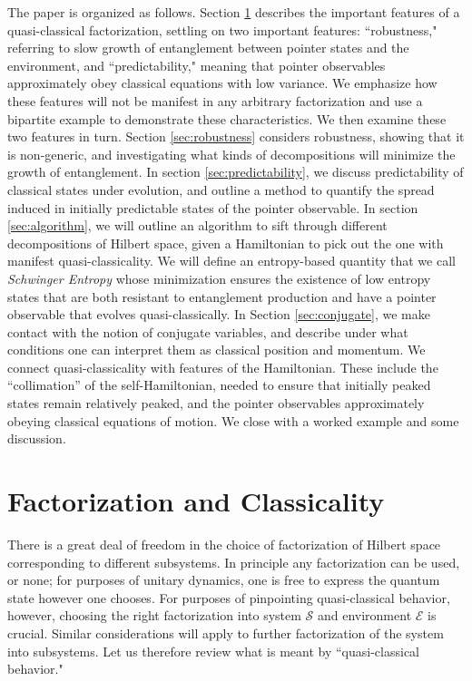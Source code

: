 \documentclass[aps,pra,onecolumn,nofootinbib,12pt,tightenlines]{revtex4-1}
\begin{document}
The paper is organized as follows. Section \ref{sec:qc_factorization} describes the important features of a quasi-classical factorization, settling on two important features: ``robustness," referring to slow growth of entanglement between pointer states and the environment, and ``predictability," meaning that pointer observables approximately obey classical equations with low variance.
We emphasize how these features will not be manifest in any arbitrary factorization and use a bipartite example to demonstrate these characteristics.
We then examine these two features in turn.
Section \ref{sec:robustness} considers robustness, showing that it is non-generic, and investigating what kinds of decompositions will minimize the growth of entanglement.
In section \ref{sec:predictability}, we discuss predictability of classical states under evolution, and outline a method to quantify the spread induced in initially predictable states of the pointer observable.
In section \ref{sec:algorithm}, we will outline an algorithm to sift through different decompositions of Hilbert space, given a Hamiltonian to pick out the one with manifest quasi-classicality. We will define an entropy-based quantity that we call \emph{Schwinger Entropy} whose minimization ensures the existence of low entropy states that are both resistant to entanglement production and have a pointer observable that evolves quasi-classically. In Section \ref{sec:conjugate}, we make contact with the notion of conjugate variables, and describe under what conditions one can interpret them as classical position and momentum. We connect quasi-classicality with features of the Hamiltonian. These include the ``collimation'' of the self-Hamiltonian, needed to ensure that initially peaked states remain relatively peaked, and the pointer observables approximately obeying classical equations of motion.
We close with a worked example and some discussion.


\section{Factorization and Classicality}
\label{sec:qc_factorization}


There is a great deal of freedom in the choice of factorization of Hilbert space corresponding to different subsystems.
In principle any factorization can be used, or none; for purposes of unitary dynamics, one is free to express the quantum state however one chooses.
For purposes of pinpointing quasi-classical behavior, however, choosing the right factorization into system $\mathcal{S}$ and environment $\mathcal{E}$ is crucial.
Similar considerations will apply to further factorization of the system into subsystems.
Let us therefore review what is meant by ``quasi-classical behavior."
\end{document}
